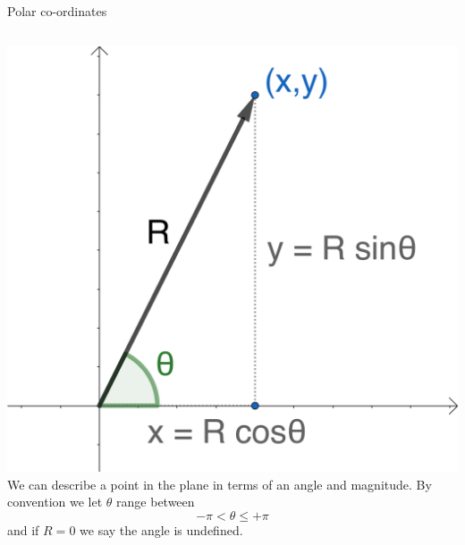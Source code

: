 \documentclass{beamer}
\begin{document}
\begin{frame}{Polar co-ordinates}
\begin{columns}
\includegraphics[scale=0.55]{polar-form.png}
We can describe a point in the plane in terms of an angle and magnitude.
By convention we let $\theta$ range between
\begin{equation*}
-\pi< \theta \leq +\pi
\end{equation*}
and if $R=0$ we say the angle is undefined.
\end{columns}
\end{frame}
\end{document}

